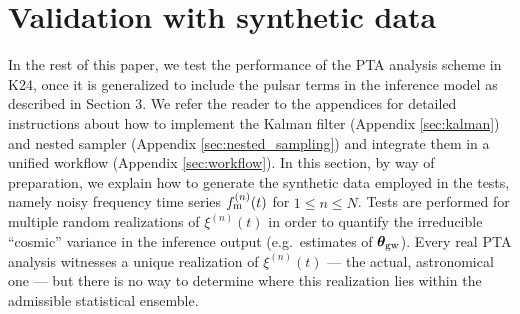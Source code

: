\documentclass[fleqn,usenatbib,useAMS]{mnras}
\begin{document}
\section{Validation with synthetic data}\label{sec:rep_example1}
In the rest of this paper, we test the performance of the PTA analysis scheme in K24, once it is generalized to include the pulsar terms in the inference model as described in Section 3. We refer the reader to the appendices for detailed instructions about how to implement the Kalman filter (Appendix \ref{sec:kalman}) and nested sampler (Appendix \ref{sec:nested_sampling}) and integrate them in a unified workflow (Appendix \ref{sec:workflow}). In this section, by way of preparation, we explain how to generate the synthetic data employed in the tests, namely noisy frequency time series $f_{\rm m}^{(n)}(t)$ for $1 \leq n \leq N$. Tests are performed for multiple random realizations of $\xi^{(n)}(t)$ in order to quantify the irreducible ``cosmic'' variance in the inference output (e.g.\ estimates of ${\boldsymbol{\theta}}_{\rm gw}$). Every real PTA analysis witnesses a unique realization of $\xi^{(n)}(t)$ --- the actual, astronomical one --- but there is no way to determine where this realization lies within the admissible statistical ensemble. \newline 



%
\end{document}
